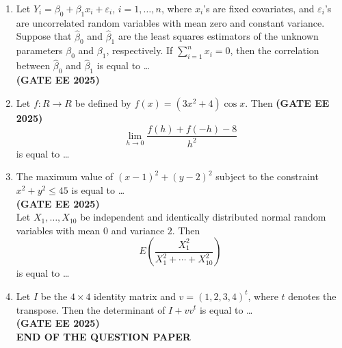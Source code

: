 \documentclass[journal,12pt,onecolumn]{IEEEtran}
\theoremstyle{remark}
\begin{document}
\begin{enumerate}
\item Let $Y_i = \beta_0 + \beta_1 x_i + \varepsilon_i$, $i=1,\ldots,n$, where $x_i$'s are fixed covariates, and $\varepsilon_i$'s are uncorrelated random variables with mean zero and constant variance. Suppose that $\hat{\beta}_0$ and $\hat{\beta}_1$ are the least squares estimators of the unknown parameters $\beta_0$ and $\beta_1$, respectively. If $\sum_{i=1}^n x_i = 0$, then the correlation between $\hat{\beta}_0$ and $\hat{\beta}_1$ is equal to \ldots \\[1em] \hfill \textbf{(GATE EE 2025)}\\

\item Let $f:{R} \to {R}$ be defined by $f(x) = (3x^2+4)\cos x$. Then \hfill \textbf{(GATE EE 2025)}\\
\[
\lim_{h \to 0} \frac{f(h) + f(-h) - 8}{h^2}
\]
is equal to \ldots \\[1em]
\item The maximum value of $(x-1)^2 + (y-2)^2$ subject to the constraint $x^2 + y^2 \leq 45$ is equal to \ldots \\[1em] \hfill \textbf{(GATE EE 2025)}\\

 Let $X_1, \ldots, X_{10}$ be independent and identically distributed normal random variables with mean $0$ and variance $2$. Then 
\[
E\!\left(\frac{X_1^2}{X_1^2 + \cdots + X_{10}^2}\right)
\]
is equal to \ldots \\[1em]
\item Let $I$ be the $4 \times 4$ identity matrix and $v = (1,2,3,4)^t$, where $t$ denotes the transpose. Then the determinant of $I + vv^t$ is equal to \ldots \\[2em] \hfill \textbf{(GATE EE 2025)}\\

\textbf{END OF THE QUESTION PAPER}

\end{enumerate}
\end{document}
